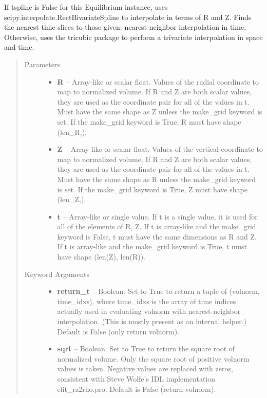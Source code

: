 \documentclass[letterpaper,10pt,english]{sphinxmanual}
\begin{document}
\begin{fulllineitems}
\begin{fulllineitems}
If tspline is False for this Equilibrium instance, uses
scipy.interpolate.RectBivariateSpline to interpolate in terms of R and
Z. Finds the nearest time slices to those given: nearest-neighbor
interpolation in time. Otherwise, uses the tricubic package to perform
a trivariate interpolation in space and time.
\begin{quote}\begin{description}
\item[{Parameters }] \leavevmode\begin{itemize}
\item {} 
\textbf{R} --
Array-like or scalar float.
Values of the radial coordinate to
map to normalized volume. If R and Z are both scalar values,
they are used as the coordinate pair for all of the values in t.
Must have the same shape as Z unless the make\_grid keyword is
set. If the make\_grid keyword is True, R must have shape (len\_R,).

\item {} 
\textbf{Z} --
Array-like or scalar float.
Values of the vertical coordinate to
map to normalized volume. If R and Z are both scalar values,
they are used as the coordinate pair for all of the values in t.
Must have the same shape as R unless the make\_grid keyword is
set. If the make\_grid keyword is True, Z must have shape (len\_Z,).

\item {} 
\textbf{t} --
Array-like or single value.
If t is a single value, it is used
for all of the elements of R, Z. If t is array-like and the
make\_grid keyword is False, t must have the same dimensions as
R and Z. If t is array-like and the make\_grid keyword is True,
t must have shape (len(Z), len(R)).

\end{itemize}

\item[{Keyword Arguments}] \leavevmode\begin{itemize}
\item {} 
\textbf{return\_t} --
Boolean.
Set to True to return a tuple of (volnorm,
time\_idxs), where time\_idxs is the array of time indices
actually used in evaluating volnorm with nearest-neighbor
interpolation. (This is mostly present as an internal helper.)
Default is False (only return volnorm).

\item {} 
\textbf{sqrt} --
Boolean.
Set to True to return the square root of normalized
volume. Only the square root of positive volnorm values is
taken. Negative values are replaced with zeros, consistent with
Steve Wolfe's IDL implementation efit\_rz2rho.pro. Default is
False (return volnorm).


\end{itemize}
\end{description}
\end{quote}
\end{fulllineitems}
\end{fulllineitems}
\end{document}
